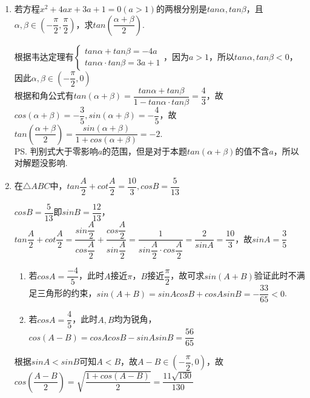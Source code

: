 \begin{enumerate}
\begin{enumerate}
        \item 若方程$x^2+4ax+3a+1 = 0 (a>1)$的两根分别是$tan\alpha, tan\beta$，且$\alpha, \beta \in (-\dfrac{\pi}{2}, \dfrac{\pi}{2})$，求$tan(\dfrac{\alpha+\beta}{2})$.
        \begin{jieda}
            根据韦达定理有$\left \{ \begin{array}{l}
                 tan\alpha + tan\beta = -4a  \\
                 tan\alpha \cdot tan\beta = 3a+1 
            \end{array}\right.$，因为$a > 1$，所以$tan\alpha, tan\beta < 0$，因此$\alpha, \beta \in (-\dfrac{\pi}{2}, 0)$ \\
            根据和角公式有$tan(\alpha + \beta) = \dfrac{tan\alpha + tan\beta}{1 - tan\alpha \cdot tan\beta} = \dfrac{4}{3}$，故$cos(\alpha+\beta) = -\dfrac{3}{5}, sin(\alpha + \beta) = -\dfrac{4}{5}$，故$tan(\dfrac{\alpha+\beta}{2}) = \dfrac{sin(\alpha+\beta)}{1+cos(\alpha + \beta)} = -2$. \\
            \ps 判别式大于零影响$a$的范围，但是对于本题$tan(\alpha + \beta)$的值不含$a$，所以对解题没影响.
        \end{jieda}
        \item 在$\triangle ABC$中，$tan\dfrac{A}{2} + cot\dfrac{A}{2} = \dfrac{10}{3}, cosB = \dfrac{5}{13}$
        \begin{jieda}
            $cosB = \dfrac{5}{13}$即$sinB = \dfrac{12}{13}$，\\
            $tan\dfrac{A}{2} + cot\dfrac{A}{2} = \dfrac{sin\dfrac{A}{2}}{cos\dfrac{A}{2}} + \dfrac{cos\dfrac{A}{2}}{sin\dfrac{A}{2}} = \dfrac{1}{sin\dfrac{A}{2} \cdot cos\dfrac{A}{2}} = \dfrac{2}{sinA} = \dfrac{10}{3}$，故$sinA = \dfrac{3}{5}$ 
            \begin{enumerate}
                \item 若$cosA = \dfrac{-4}{5}$，此时$A$接近$\pi$，$B$接近$\dfrac{\pi}{2}$，故可求$sin(A+B)$验证此时不满足三角形的约束，$sin(A+B) = sinA cosB + cosA sinB = -\dfrac{33}{65} < 0$.
                \item 若$cosA = \dfrac{4}{5}$，此时$A, B$均为锐角，$cos(A-B) = cosA cosB - sinA sinB = \dfrac{56}{65}$
            \end{enumerate}
            根据$sinA < sinB$可知$A < B$，故$A - B \in (-\dfrac{\pi}{2}, 0)$，故$cos(\dfrac{A-B}{2}) = \sqrt{\dfrac{1+cos(A-B)}{2}} = \dfrac{11\sqrt{130}}{130}$

\end{jieda}
\end{enumerate}
\end{enumerate}
